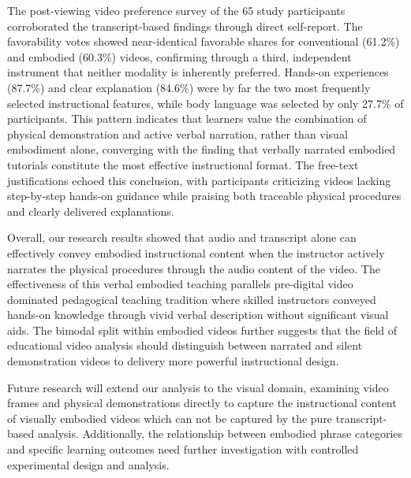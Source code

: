 The post-viewing video preference survey of the 65 study participants corroborated the transcript-based findings through direct self-report. The favorability votes showed near-identical favorable shares for conventional (61.2\%) and embodied (60.3\%) videos, confirming through a third, independent instrument that neither modality is inherently preferred. Hands-on experiences (87.7\%) and clear explanation (84.6\%) were by far the two most frequently selected instructional features, while body language was selected by only 27.7\% of participants. This pattern indicates that learners value the combination of physical demonstration and active verbal narration, rather than visual embodiment alone, converging with the finding that verbally narrated embodied tutorials constitute the most effective instructional format. The free-text justifications echoed this conclusion, with participants criticizing videos lacking step-by-step hands-on guidance while praising both traceable physical procedures and clearly delivered explanations.

Overall, our research results showed that audio and transcript alone can effectively convey embodied instructional content when the instructor actively narrates the physical procedures through the audio content of the video. The effectiveness of this verbal embodied teaching parallels pre-digital video dominated pedagogical teaching tradition where skilled instructors conveyed hands-on knowledge through vivid verbal description without significant visual aids. The bimodal split within embodied videos further suggests that the field of educational video analysis should distinguish between narrated and silent demonstration videos to delivery more powerful instructional design.

Future research will extend our analysis to the visual domain, examining video frames and physical demonstrations directly to capture the instructional content of visually embodied videos which can not be captured by the pure transcript-based analysis. Additionally, the relationship between embodied phrase categories and specific learning outcomes need further investigation with controlled experimental design and analysis. 









